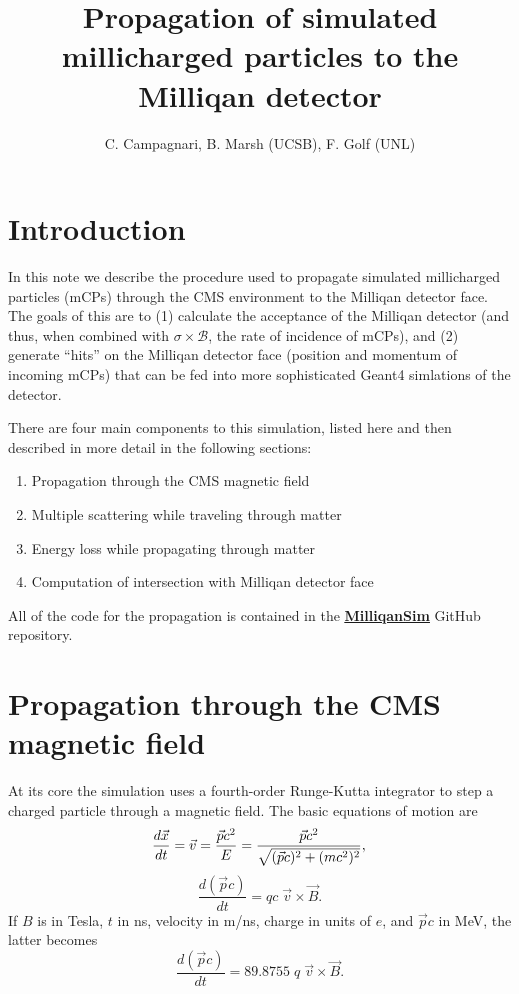 \documentclass[11pt]{article}
\title{Propagation of simulated millicharged particles to the Milliqan detector}
\author{C. Campagnari, B. Marsh (UCSB), F. Golf (UNL)}
\begin{document}
\maketitle


\section{Introduction}
In this note we describe the procedure used to propagate simulated millicharged
particles (mCPs) through the CMS environment to the Milliqan detector face. The goals 
of this are to (1) calculate the acceptance of the Milliqan detector (and thus,
when combined with $\sigma\times\mathcal{B}$, the rate of incidence of mCPs),
and (2) generate ``hits'' on the Milliqan detector face  (position and momentum of incoming mCPs)
that can be fed into more sophisticated Geant4 simlations of the detector.

There are four main components to this simulation, listed here and then described in more
detail in the following sections:
\begin{enumerate}
\item Propagation through the CMS magnetic field
\item Multiple scattering while traveling through matter
\item Energy loss while propagating through matter
\item Computation of intersection with Milliqan detector face
\end{enumerate}

All of the code for the propagation is contained in the \href{https://github.com/bjmarsh/MilliqanSim}{\underline{\bf MilliqanSim}} GitHub repository.

\section{Propagation through the CMS magnetic field}
At its core the simulation uses a fourth-order Runge-Kutta integrator to step a charged particle
through a magnetic field. The basic equations of motion are
\begin{equation}\label{eq:dxdt}
\frac{d\vec{x}}{dt} = \vec{v} = \frac{\vec{p}c^2}{E} = \frac{\vec{p}c^2}{\sqrt{(\vec{p}c)^2+(mc^2)^2}}, \\
\end{equation}
\begin{equation}\label{eq:dpdt}
\frac{d(\vec{p}c)}{dt} = qc\;\vec{v}\times\vec{B}.
\end{equation}
If $B$ is in Tesla, $t$ in ns, velocity in m/ns, charge in units of $e$, and $\vec{p}c$ in MeV, the latter becomes
\begin{equation}\label{eq:dpdt_mod}
\frac{d(\vec{p}c)}{dt} = 89.8755\;q\;\vec{v}\times\vec{B}.
\end{equation}
\end{document}
